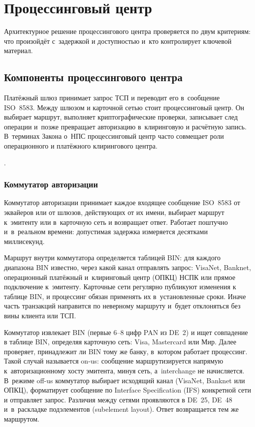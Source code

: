 
\chapter{Процессинговый центр}\label{ch:processing-center}
Архитектурное решение процессингового центра проверяется
по двум критериям: что произойдёт с~задержкой и доступностью и~кто контролирует
ключевой материал.

\section{Компоненты процессингового центра}\label{sec:pc-components}

Платёжный шлюз принимает запрос ТСП и переводит его
в~сообщение ISO~8583. Между шлюзом и карточной сетью стоит
процессинговый центр. Он выбирает маршрут,
выполняет криптографические проверки, записывает след операции
и~позже превращает авторизацию в~клиринговую и расчётную запись.
В~терминах Закона о~НПС процессинговый центр часто совмещает роли
операционного и платёжного клирингового центра.

.

\subsection*{Коммутатор авторизации}

Коммутатор авторизации принимает каждое входящее
сообщение ISO~8583 от эквайеров или от шлюзов, действующих
от их имени, выбирает маршрут к~эмитенту или в~карточную сеть
и возвращает ответ. Работает поштучно и~в~реальном времени:
допустимая задержка измеряется десятками
миллисекунд.~\cite{visa-core-rules,mc-tpr}

Маршрут внутри коммутатора определяется таблицей BIN:
для каждого диапазона BIN известно, через какой канал отправлять
запрос: VisaNet, Banknet, операционный платёжный и~клиринговый центр (ОПКЦ) НСПК или прямое подключение
к~эмитенту. Карточные сети регулярно публикуют изменения
к таблице BIN, и процессинг обязан применять их в~установленные сроки.
Иначе часть транзакций направится по неверному маршруту и~будет отклоняться без вины
клиента или ТСП.~\cite{visa-core-rules,mc-rules}

Коммутатор извлекает BIN (первые 6--8 цифр PAN из DE~2)
и ищет совпадение в таблице BIN, определяя карточную сеть:
Visa, Mastercard или Мир. Далее проверяет, принадлежит ли BIN
тому же банку, в~котором работает процессинг. Такой случай
называется on-us: сообщение маршрутизируется напрямую
к~авторизационному хосту эмитента, минуя сеть, а~interchange
не начисляется. В~режиме off-us коммутатор выбирает исходящий
канал (VisaNet, Banknet или ОПКЦ), форматирует сообщение
по Interface Specification (IFS) конкретной сети и отправляет запрос.
Различия между сетями проявляются в DE~25, DE~48 и~в~раскладке подэлементов (subelement layout). Ответ возвращается тем же маршрутом.

